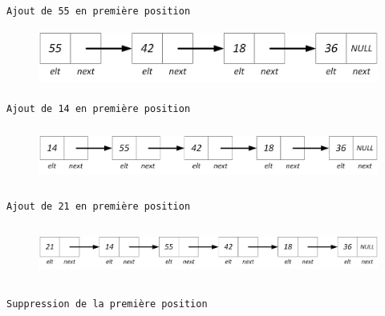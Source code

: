 \documentclass[11pt,a4paper]{article}
\begin{document}
\begin{center}


\texttt{Ajout de 55 en première position}

\begin{figure}[ht!]
\centering
\centerline{  %
\includegraphics[height=1.85cm]{img/p-1-Liste_p_4.png}
}
\end{figure}


\texttt{Ajout de 14 en première position}

\begin{figure}[ht!]
\centering
\centerline{  %
\includegraphics[height=1.85cm]{img/p-2-Liste_p_5.png}
}
\end{figure}


\texttt{Ajout de 21 en première position}

\begin{figure}[ht!]
\centering
\centerline{  %
\includegraphics[height=1.85cm]{img/p-3-Liste_p_6.png}
}
\end{figure}


\texttt{Suppression de la première position}


\end{center}
\end{document}
